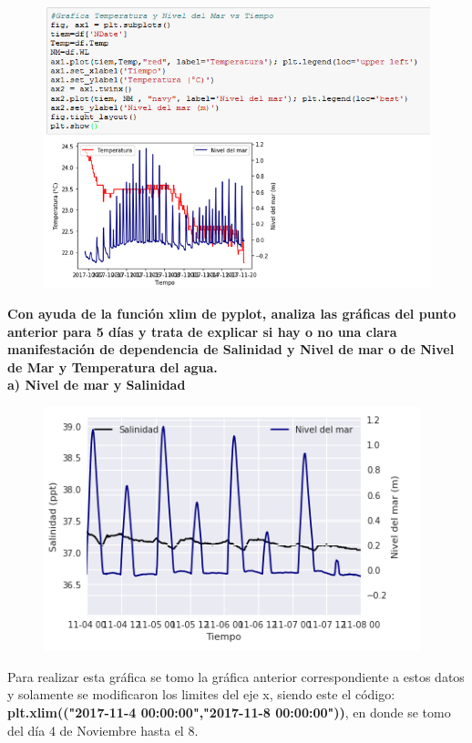 \documentclass[12pt]{article}
\begin{document}
\begin{figure}[h!]
    \centering
\includegraphics[width=6in]{SP2.png}
\end{figure}

\noindent\textbf {Con ayuda de la función xlim de pyplot, analiza las gráficas del punto anterior para 5 días y trata de explicar si hay o no una clara manifestación de dependencia de Salinidad y Nivel de mar o de Nivel de Mar y Temperatura del agua. } \\

\noindent\textbf {a) Nivel de mar y Salinidad} 

\begin{figure}[h!]
    \centering
\includegraphics[width=4.3in]{SP1lim.png}
\end{figure}

Para realizar esta gráfica se tomo la gráfica anterior correspondiente a estos datos y solamente se modificaron los limites del eje x, siendo este el código: \textbf{plt.xlim(("2017-11-4 00:00:00","2017-11-8 00:00:00"))}, en donde se tomo del día 4 de Noviembre hasta el 8. \\
\end{document}
